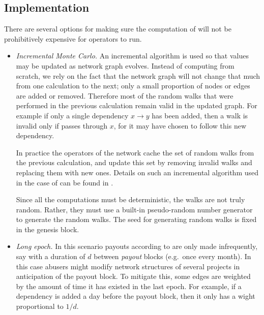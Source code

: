 

\subsection{Implementation}

There are several options for making sure the computation of \osrank{}
will not be prohibitively expensive for operators to run.

\begin{itemize}
\item \emph{Incremental Monte Carlo.} An incremental algorithm is used
  so that \osrank{} values may be updated as network graph
  evolves. Instead of computing \osrank{} from scratch, we rely on the
  fact that the network graph will not change that much from one
  calculation to the next; only a small proportion of nodes or edges
  are added or removed. Therefore most of the random walks that were
  performed in the previous calculation remain valid in the updated
  graph. For example if only a single dependency $x \to y$ has been
  added, then a walk is invalid only if passes through $x$, for it may
  have chosen to follow this new dependency.

  In practice the operators of the network cache the set of random
  walks from the previous calculation, and update this set by removing
  invalid walks and replacing them with new ones. Details on such an
  incremental algorithm used in the case of \pagerank{} can be found
  in \cite{incr_pagerank}.

  Since all the computations must be deterministic, the walks are not
  truly random. Rather, they must use a built-in pseudo-random number
  generator to generate the random walks. The seed for generating
  random walks is fixed in the genesis block.

\item \emph{Long epoch.} In this scenario payouts according to
  \osrank{} are only made infrequently, say with a duration of $d$
  between \emph{payout} blocks (e.g.\ once every month). In this case
  abusers might modify network structures of several projects in
  anticipation of the payout block. To mitigate this, some edges are
  weighted by the amount of time it has existed in the last epoch. For
  example, if a dependency is added a day before the payout block,
  then it only has a wight proportional to $1/d$.
\end{itemize}
  
